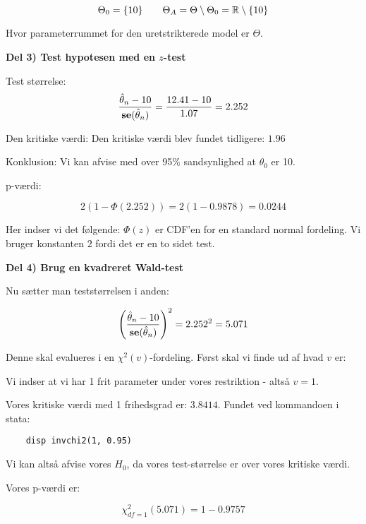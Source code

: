 \begin{equation}
    \Theta_0 = \{10\} \qquad \Theta_A = \Theta \setminus \Theta_0 = \mathbb{R} \setminus \{10\}
\end{equation}

Hvor parameterrummet for den uretstrikterede model er $\Theta$.

\textbf{Del 3) Test hypotesen med en $z$-test}


Test størrelse:
\begin{equation}
    \frac{\hat{\theta}_n - 10}{\textbf{se}(\hat{\theta}_n)} = \frac{12.41 - 10}{1.07} = 2.252
\end{equation}

Den kritiske værdi: Den kritiske værdi blev fundet tidligere: $1.96$

Konklusion: Vi kan afvise med over 95\% sandsynlighed at $\theta_0$  er 10.

p-værdi:

\begin{equation}
    2 (1 - \Phi(2.252)) =2(1 - 0.9878) = 0.0244
\end{equation}

Her indser vi det følgende:  $\Phi(z)$ er CDF'en for en standard normal fordeling. Vi bruger konstanten $2$ fordi det er en to sidet test.

\textbf{Del 4) Brug en kvadreret Wald-test}

Nu sætter man teststørrelsen i anden:

\begin{equation}
    \left( \frac{\hat{\theta}_n - 10}{\textbf{se}(\hat{\theta}_n)} \right)^2 = 2.252^2 = 5.071
\end{equation}

Denne skal evalueres i en $\chi^2(v)$-fordeling. Først skal vi finde ud af hvad $v$ er:

Vi indser at vi har 1 frit parameter under vores restriktion - altså $v=1$.

Vores kritiske værdi med 1 frihedsgrad er: $3.8414$. Fundet ved kommandoen i stata:

\begin{verbatim}
    disp invchi2(1, 0.95)
\end{verbatim}

Vi kan altså afvise vores $H_0$, da vores test-størrelse er over vores kritiske værdi.

Vores p-værdi er:

\begin{equation}
    \chi^2_{df=1}(5.071) = 1 - 0.9757
\end{equation}

